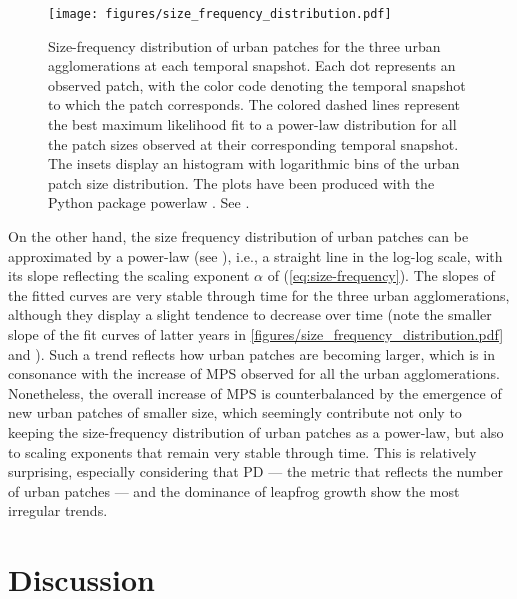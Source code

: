 \begin{figure}[!ht]
  \begin{adjustwidth}{0cm}{-.4\textwidth}
    \centering
    \texttt{[image: figures/size\_frequency\_distribution.pdf]}
    \vspace{.5em}
    \caption[Size-frequency distribution of urban patches]{\label{figures/size_frequency_distribution.pdf}Size-frequency distribution of urban patches for the three urban agglomerations at each temporal snapshot. Each dot represents an observed patch, with the color code denoting the temporal snapshot to which the patch corresponds. The colored dashed lines represent the best maximum likelihood fit to a power-law distribution for all the patch sizes observed at their corresponding temporal snapshot. The insets display an histogram with logarithmic bins of the urban patch size distribution. The plots have been produced with the Python package powerlaw \citep{alstott2014powerlaw}. See .}
  \end{adjustwidth}
\end{figure}

On the other hand, the size frequency distribution of urban patches can be approximated by a power-law (see ), i.e., a straight line in the log-log scale, with its slope reflecting the scaling exponent $\alpha$ of (\ref{eq:size-frequency}). The slopes of the fitted curves are very stable through time for the three urban agglomerations, although they display a slight tendence to decrease over time (note the smaller slope of the fit curves of latter years in \autoref{figures/size_frequency_distribution.pdf} and ).
Such a trend reflects how urban patches are becoming larger, which is in consonance with the increase of MPS observed for all the urban agglomerations.
Nonetheless, the overall increase of MPS is counterbalanced by the emergence of new urban patches of smaller size, which seemingly contribute not only to keeping the size-frequency distribution of urban patches as a power-law, but also to scaling exponents that remain very stable through time. This is relatively surprising, especially considering that PD --- the metric that reflects the number of urban patches --- and the dominance of leapfrog growth show the most irregular trends.


\section*{Discussion}

